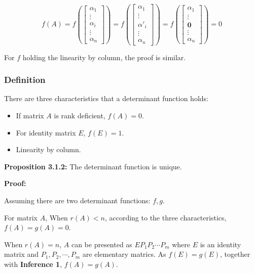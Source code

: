 \documentclass{article}
\begin{document}
\begin{equation}
f(A)=f(
\begin{bmatrix}
    \alpha_1 \\
    \vdots \\
    \alpha_i \\
    \vdots \\
    \alpha_n
\end{bmatrix})=
f(\begin{bmatrix}
    \alpha_1 \\
    \vdots \\
    \alpha'_i \\
    \vdots \\
    \alpha_n
\end{bmatrix})=
f(\begin{bmatrix}
    \alpha_1 \\
    \vdots \\
    \mathbf{0} \\
    \vdots \\
    \alpha_n
\end{bmatrix})=0
\end{equation}

For \(f\) holding the linearity by column, the proof is similar.

\subsubsection{Definition}

There are three characteristics that a determinant function holds:

\begin{itemize}
    \item If matrix \(A\) is rank deficient, \(f(A)=0\).
    \item For identity matrix \(E\), \(f(E)=1\).
    \item Linearity by column.
\end{itemize}

\vspace{2mm}
\textbf{Proposition 3.1.2:} The determinant function is unique.

\vspace{2mm}
\textbf{Proof:}

Assuming there are two determinant functions: \(f, g\). 

For matrix \(A\), When \(r(A)<n\), according to the three characteristics,
\(f(A)=g(A)=0\).

When \(r(A)=n\), \(A\) can be presented as \(EP_1P_2\cdots P_m\) where
\(E\) is an identity matrix and \(P_1, P_2, \cdots, P_m\) are elementary
matrics. As \(f(E)=g(E)\), together with \textbf{Inference 1}, 
\(f(A)=g(A)\).
\end{document}
